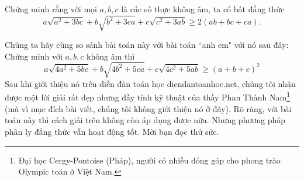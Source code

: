 \begin{bt}%
	Chứng minh rằng với mọi $a,b,c$ là các số thực không âm, ta có bất đẳng thức
	\[a\sqrt{a^2+3bc}+b\sqrt{b^2+3ca}+c\sqrt{c^2+3ab}\geq 2(ab+bc+ca).\]
\begin{nx}
	Chúng ta hãy cùng so sánh bài toán này với bài toán ``anh em" với nó sau đây: Chứng minh với $a,b,c$ không âm thì
	\[a\sqrt{4a^2+5bc}+b\sqrt{4b^2+5ca}+c\sqrt{4c^2+5ab}\geq (a+b+c)^2\]
	Sau khi giới thiệu nó trên diễn đàn toán học diendantoanhoc.net, chúng tôi nhận được một lời giải rất đẹp nhưng đầy tính kỹ thuật của thầy Phan Thành Nam\footnote{Đại học Cergy-Pontoise (Pháp), người có nhiều đóng góp cho phong trào Olympic toán ở Việt Nam.} (mà vì mục đích bài viết, chúng tôi không giới thiệu nó ở đây). Rõ ràng, với bài toán này thì cách giải trên không còn áp dụng được nữa. Nhưng phương pháp phân ly đẳng thức vẫn hoạt động tốt. Mời bạn đọc thử sức.
\end{nx}
\end{bt}
